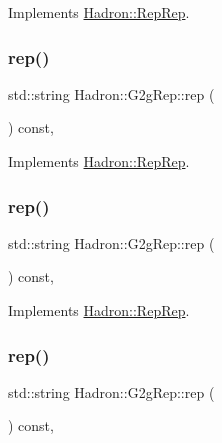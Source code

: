 Implements \mbox{\hyperlink{structHadron_1_1RepRep_ab3213025f6de249f7095892109575fde}{Hadron\+::\+Rep\+Rep}}.

\mbox{\label{structHadron_1_1G2gRep_a18380ef621e1c6761e5a8b3ff7170f87}} 
\subsubsection{\texorpdfstring{rep()}{rep()}\hspace{0.1cm}{\footnotesize\ttfamily [2/5]}}
{\footnotesize\ttfamily std\+::string Hadron\+::\+G2g\+Rep\+::rep (\begin{DoxyParamCaption}{ }\end{DoxyParamCaption}) const\hspace{0.3cm}{\ttfamily [inline]}, {\ttfamily [virtual]}}



Implements \mbox{\hyperlink{structHadron_1_1RepRep_ab3213025f6de249f7095892109575fde}{Hadron\+::\+Rep\+Rep}}.

\mbox{\label{structHadron_1_1G2gRep_a18380ef621e1c6761e5a8b3ff7170f87}} 
\subsubsection{\texorpdfstring{rep()}{rep()}\hspace{0.1cm}{\footnotesize\ttfamily [3/5]}}
{\footnotesize\ttfamily std\+::string Hadron\+::\+G2g\+Rep\+::rep (\begin{DoxyParamCaption}{ }\end{DoxyParamCaption}) const\hspace{0.3cm}{\ttfamily [inline]}, {\ttfamily [virtual]}}



Implements \mbox{\hyperlink{structHadron_1_1RepRep_ab3213025f6de249f7095892109575fde}{Hadron\+::\+Rep\+Rep}}.

\mbox{\label{structHadron_1_1G2gRep_a18380ef621e1c6761e5a8b3ff7170f87}} 
\subsubsection{\texorpdfstring{rep()}{rep()}\hspace{0.1cm}{\footnotesize\ttfamily [4/5]}}
{\footnotesize\ttfamily std\+::string Hadron\+::\+G2g\+Rep\+::rep (\begin{DoxyParamCaption}{ }\end{DoxyParamCaption}) const\hspace{0.3cm}{\ttfamily [inline]}, {\ttfamily [virtual]}}



